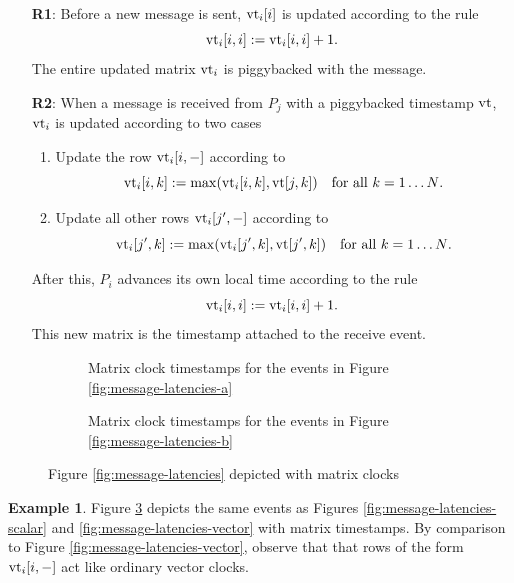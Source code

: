 \documentclass[]             %
{NASA}                       %
\theoremstyle{definition}
\newtheorem{example}[theorem]{Example}
\begin{document}
\begin{enumerate}
\item[\textbf{R1}:] Before a new message is sent, $\textrm{vt}_i[i]$ is updated according to the rule
  \[\textrm{vt}_i[i,i] := \textrm{vt}_i[i,i] + 1.\]
  The entire updated matrix $\textrm{vt}_i$ is piggybacked with the message.
\item[\textbf{R2}:] When a message is received from $P_j$ with a piggybacked timestamp $\textrm{vt}$,
  $\textrm{vt}_i$ is updated according to two cases
  \begin{enumerate}
  \item Update the row $\textrm{vt}_i[i, -]$ according to
    \[\textrm{vt}_i[i, k] := \max(\textrm{vt}_i[i,k], \textrm{vt}[j, k]) \quad \textrm{for all $k = 1\ldots N$}.\]
  \item Update all other rows $\textrm{vt}_i[j', -]$ according to
    \[\textrm{vt}_i[j', k] := \max(\textrm{vt}_i[j',k], \textrm{vt}[j', k]) \quad \textrm{for all $k = 1\ldots N$}.\]
  \end{enumerate}
  After this, $P_i$ advances its own local time according to the rule
  \[ \textrm{vt}_i[i,i] := \textrm{vt}_i[i,i] + 1.\]
  This new matrix is the timestamp attached to the receive event.
\end{enumerate}

\begin{figure}[p]
  \begingroup
  \setlength\belowcaptionskip{4ex}
  \begin{subfigure}{1\textwidth}
    \caption{Matrix clock timestamps for the events in Figure \ref{fig:message-latencies-a}}
    \label{fig:message-latencies-matrix-a}
  \end{subfigure}
  \begin{subfigure}{1\textwidth}
    \caption{Matrix clock timestamps for the events in Figure \ref{fig:message-latencies-b}}
    \label{fig:message-latencies-matrix-b}
  \end{subfigure}
  \caption{Figure \ref{fig:message-latencies} depicted with matrix clocks}
  \label{fig:message-latencies-matrix}
  \endgroup
\end{figure}

\begin{example}
  Figure \ref{fig:message-latencies-matrix} depicts the same events as
  Figures \ref{fig:message-latencies-scalar} and
  \ref{fig:message-latencies-vector} with matrix timestamps. By
  comparison to Figure \ref{fig:message-latencies-vector}, observe
  that that rows of the form $\textrm{vt}_i[i,-]$ act like ordinary vector
  clocks.
\end{example}
\end{document}
